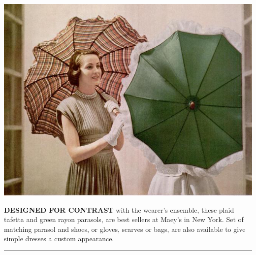 
\clearpage


\parindent0pt
\pagestyle{empty}


\vspace*{-1cm}
\begin{minipage}{1.05\textwidth}
\hskip-0.9cm\includegraphics[width=1.03\textwidth]{./images/parasol-05.jpg}\\[-27.5pt]
\setlength{\linewidth}{0.95\textwidth}
\setlength{\columnsep}{10pt}
\begin{multicols}{2}
\noindent \footnotesize\textbf{DESIGNED FOR CONTRAST} with the wearer's ensemble, these plaid  tafetta and green rayon parasols, are best sellers at Maey's in New York. Set of matching parasol and shoes, or
gloves, scarves or bags, are also available to give simple dresses
a custom appearance.
\end{multicols}
\vspace{-0.25cm}
\rule{1.5cm}{0pt}
\end{minipage}

